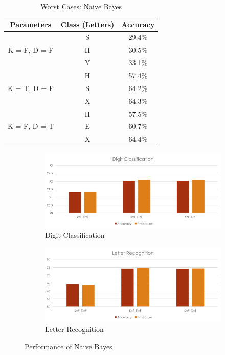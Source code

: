 \documentclass[11pt]{article}
\begin{document}
\begin{table}[!htb]

\centering
\begin{tabular}{c  c  c} \hline

Parameters & Class (Letters) & Accuracy \\\hline
\multirow{3}{*}{K = F, D = F} & S & 29.4\% \\
	& H & 30.5\% \\
	& Y & 33.1\% \\\hline
\multirow{3}{*}{K = T, D = F} & H & 57.4\% \\
	& S & 64.2\% \\
	& X & 64.3\% \\\hline
\multirow{3}{*}{K = F, D = T} & H & 57.5\% \\
	& E & 60.7\% \\
	& X & 64.4\% \\\hline
\end{tabular}
\caption{Worst Cases: Naive Bayes} %
\label{tbl:bayes}
\end{table}


\begin{figure}[htbp]
\centering

\begin{subfigure}[htbp]{0.46\columnwidth}
\includegraphics*[width=\textwidth]{fig/digit_bayes}
\caption{Digit Classification}
\label{fig:digit-bayes}
\end{subfigure}
\hfill
\begin{subfigure}[htbp]{0.46\columnwidth}
\includegraphics*[width=\textwidth]{fig/letter_bayes}
\caption{Letter Recognition}
\label{fig:letter-bayes}
\end{subfigure}
\caption{Performance of Naive Bayes}
\label{fig:bayes}
\end{figure}
\end{document}
